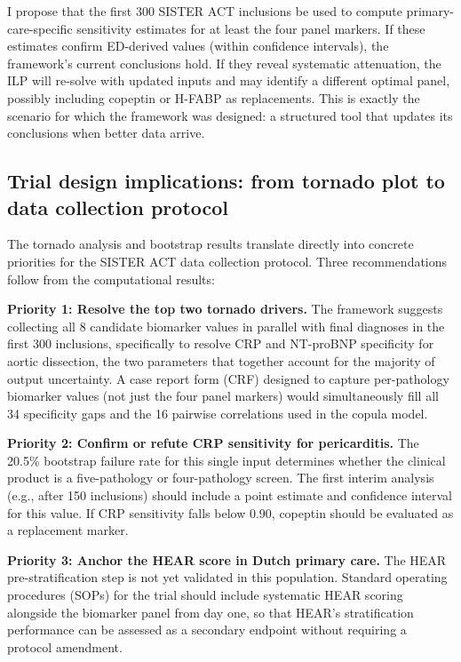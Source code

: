 \documentclass[11pt, oneside]{article}
\begin{document}
I propose that the first 300 SISTER ACT inclusions be used to compute primary-care-specific sensitivity estimates for at least the four panel markers. If these estimates confirm ED-derived values (within confidence intervals), the framework's current conclusions hold. If they reveal systematic attenuation, the ILP will re-solve with updated inputs and may identify a different optimal panel, possibly including copeptin or H-FABP as replacements. This is exactly the scenario for which the framework was designed: a structured tool that updates its conclusions when better data arrive.

\subsection{Trial design implications: from tornado plot to data collection protocol}

The tornado analysis and bootstrap results translate directly into concrete priorities for the SISTER ACT data collection protocol. Three recommendations follow from the computational results:

\textbf{Priority 1: Resolve the top two tornado drivers.} The framework suggests collecting all 8 candidate biomarker values in parallel with final diagnoses in the first 300 inclusions, specifically to resolve CRP and NT-proBNP specificity for aortic dissection, the two parameters that together account for the majority of output uncertainty. A case report form (CRF) designed to capture per-pathology biomarker values (not just the four panel markers) would simultaneously fill all 34 specificity gaps and the 16 pairwise correlations used in the copula model.

\textbf{Priority 2: Confirm or refute CRP sensitivity for pericarditis.} The 20.5\% bootstrap failure rate for this single input determines whether the clinical product is a five-pathology or four-pathology screen. The first interim analysis (e.g., after 150 inclusions) should include a point estimate and confidence interval for this value. If CRP sensitivity falls below 0.90, copeptin should be evaluated as a replacement marker.

\textbf{Priority 3: Anchor the HEAR score in Dutch primary care.} The HEAR pre-stratification step is not yet validated in this population. Standard operating procedures (SOPs) for the trial should include systematic HEAR scoring alongside the biomarker panel from day one, so that HEAR's stratification performance can be assessed as a secondary endpoint without requiring a protocol amendment.
\end{document}
